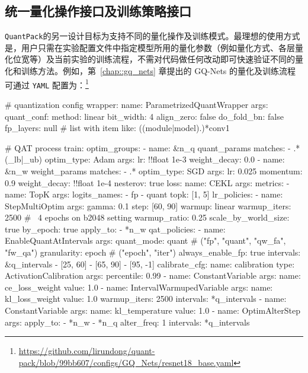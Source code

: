 \documentclass[
  fontset = source,
]{shtthesis}
\providecommand{\QP}{\texttt{QuantPack}}
\begin{document}
\subsection{统一量化操作接口及训练策略接口} \label{sec::appendix::internal_interface}
\QP 的另一设计目标为支持不同的量化操作及训练模式。最理想的使用方式是，用户只需在实验配置文件中指定模型所用的量化参数（例如量化方式、各层量化位宽等）及当前实验的训练流程，不需对代码做任何改动即可快速验证不同的量化和训练方法。例如，第~\ref{chap::gq_nets} 章提出的 GQ-Nets 的量化及训练流程可通过 \verb|YAML| 配置为：\footnote{\url{https://github.com/lirundong/quant-pack/blob/99bb607/configs/GQ_Nets/resnet18_base.yaml}}
\begin{yaml}
# quantization config
wrapper:
  name: ParametrizedQuantWrapper
  args:
    quant_conf:
      method: linear
      bit_width: 4
      align_zero: false
    do_fold_bn: false
    fp_layers: null # list with item like: ((module|model).)*conv1

# QAT process
train:
  optim_groups:
    - name: &n_q quant_params
      matches:
        - .*(_lb|_ub)
      optim_type: Adam
      args:
        lr: !!float 1e-3
        weight_decay: 0.0
    - name: &n_w weight_params
      matches:
        - .*
      optim_type: SGD
      args:
        lr: 0.025
        momentum: 0.9
        weight_decay: !!float 1e-4
        nesterov: true
  loss:
    name: CEKL
    args: {}
  metrics:
    - name: TopK
      args:
        logits_names:
          - fp
          - quant
        topk: [1, 5]
  lr_policies:
    - name: StepMultiOptim
      args:
        gamma: 0.1
        step: [60, 90]
        warmup: linear
        warmup_iters: 2500  # ~4 epochs on b2048 setting
        warmup_ratio: 0.25
        scale_by_world_size: true
        by_epoch: true
        apply_to:
          - *n_w
  qat_policies:
    - name: EnableQuantAtIntervals
      args:
        quant_mode: quant  # ("fp", "quant", "qw_fa", "fw_qa")
        granularity: epoch  # ("epoch", "iter")
        always_enable_fp: true
        intervals: &q_intervals
          - [25, 60]
          - [65, 90]
          - [95, -1]
        calibrate_cfg:
          name: calibration
          type: ActivationCalibration
          args:
            percentile: 0.99
    - name: ConstantVariable
      args:
        name: ce_loss_weight
        value: 1.0
    - name: IntervalWarmupedVariable
      args:
        name: kl_loss_weight
        value: 1.0
        warmup_iters: 2500
        intervals: *q_intervals
    - name: ConstantVariable
      args:
        name: kl_temperature
        value: 1.0
    - name: OptimAlterStep
      args:
        apply_to:
          - *n_w
          - *n_q
        alter_freq: 1
        intervals: *q_intervals
\end{yaml}
\end{document}
